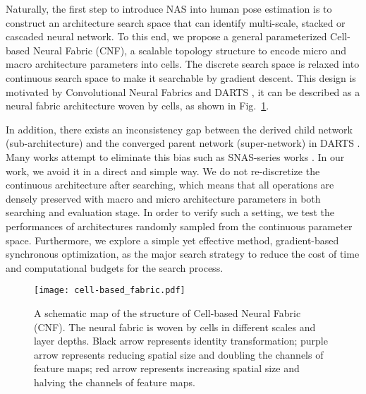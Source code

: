 \documentclass[journal]{IEEEtran}
\begin{document}
Naturally, the first step to introduce NAS into human pose estimation is to construct an architecture search space that can identify multi-scale, stacked or cascaded neural network. To this end, we propose a general parameterized Cell-based Neural Fabric (CNF), a scalable topology structure to encode micro and macro architecture parameters into cells. The discrete search space is relaxed into continuous search space to make it searchable by gradient descent. This design is motivated by Convolutional Neural Fabrics \cite{saxena2016convolutional} and DARTS \cite{liu2018darts}, it can be described as a neural fabric architecture woven by cells, as shown in Fig.~\ref{cnf_}. 


In addition, there exists an inconsistency gap between the derived child network (sub-architecture) and the converged parent network (super-network) in DARTS \cite{liu2018darts}. Many works attempt to eliminate this bias such as SNAS-series works \cite{xie2018snas, hu2020dsnas}. In our work, we avoid it in a direct and simple way. We do not re-discretize the continuous architecture after searching, which means that all operations are densely preserved with macro and micro architecture parameters in both searching and evaluation stage. In order to verify such a setting, we test the performances of architectures randomly sampled from the continuous parameter space. Furthermore, we explore a simple yet effective method, gradient-based synchronous optimization, as the major search strategy to reduce the cost of time and computational budgets for the search process.
 \begin{figure}
 	
	\begin{center}
\texttt{[image: cell-based\_fabric.pdf]} \end{center}
	\caption{A schematic map of the structure of Cell-based Neural Fabric (CNF). The neural fabric is woven by cells in different scales and layer depths. Black arrow represents identity transformation; purple arrow represents reducing spatial size and doubling the channels of feature maps; red arrow represents increasing spatial size and halving the channels of feature maps. }
\label{cnf_}
\end{figure}
\end{document}
